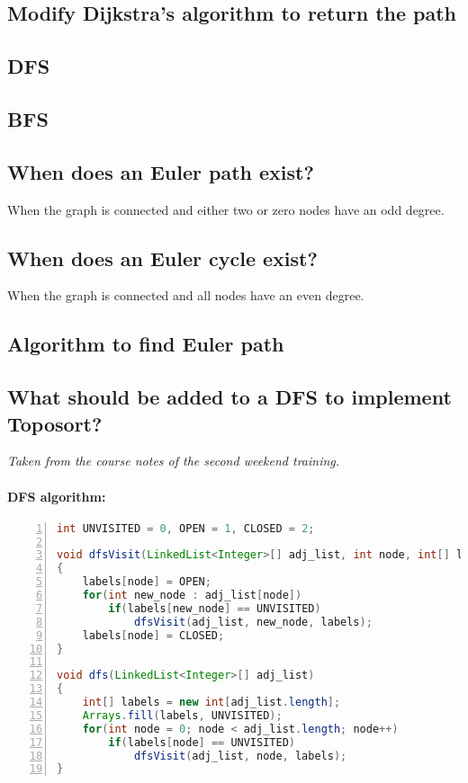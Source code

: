 \subsection{Modify Dijkstra's algorithm to return the path}


\subsection{DFS}


\subsection{BFS}


\subsection{When does an Euler path exist?}
When the graph is connected and either two or zero nodes have an odd degree.

\subsection{When does an Euler cycle exist?}
When the graph is connected and all nodes have an even degree.

\subsection{Algorithm to find Euler path}
\subsection{What should be added to a DFS to implement Toposort?}
\textit{Taken from the course notes of the second weekend training.}
\paragraph{DFS algorithm:}
\begin{lstlisting}[label=code-dfs,caption=DFS algorithm, language=Java, tabsize=2, breaklines=true, numbers=left]
int UNVISITED = 0, OPEN = 1, CLOSED = 2;

void dfsVisit(LinkedList<Integer>[] adj_list, int node, int[] labels)
{
	labels[node] = OPEN;
	for(int new_node : adj_list[node])
		if(labels[new_node] == UNVISITED)
			dfsVisit(adj_list, new_node, labels);
	labels[node] = CLOSED;
}

void dfs(LinkedList<Integer>[] adj_list)
{
	int[] labels = new int[adj_list.length];
	Arrays.fill(labels, UNVISITED);
	for(int node = 0; node < adj_list.length; node++)
		if(labels[node] == UNVISITED)
			dfsVisit(adj_list, node, labels);
}
\end{lstlisting}
